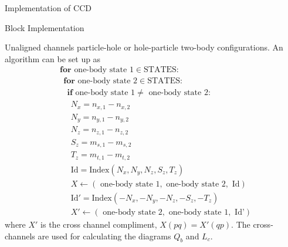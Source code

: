 \documentclass[twoside,english]{uiofysmaster}
\begin{document}
\begin{chapter}{Implementation of CCD}
\begin{section}{Block Implementation}
\begin{subsection}{Unaligned channels}
                        particle-hole or hole-particle two-body
                        configurations. An algorithm can be set up as
			\begin{align*}
				&\mathbf{for } \text{ one-body state 1} \in \text{STATES}:\\
				&\:\: \mathbf{for } \text{ one-body state 2} \in \text{STATES}:\\
				&\:\:\:\: \mathbf{if} \text{ one-body state 1} \neq \text{ one-body state 2}:\\
				&\:\:\:\:\:\: N_x = n_{x,1} - n_{x,2} \\
				&\:\:\:\:\:\: N_y = n_{y,1} - n_{y,2} \\
				&\:\:\:\:\:\: N_z = n_{z,1} - n_{z,2} \\
 				&\:\:\:\:\:\: S_z = m_{s,1} - m_{s,2} \\
				&\:\:\:\:\:\: T_z = m_{t,1} - m_{t,2} \\
				&\:\:\:\:\:\: \text{Id} = \text{Index}(N_x,N_y,N_z,S_z,T_z) \\
				&\:\:\:\:\:\: X \leftarrow (\text{ one-body state 1}, \text{ one-body state 2}, \text{ Id}) \\
				&\:\:\:\:\:\: \text{Id}' = \text{Index}(-N_x,-N_y,-N_z,-S_z,-T_z) \\
				&\:\:\:\:\:\: X' \leftarrow (\text{ one-body state 2}, \text{ one-body state 1}, \text{ Id'})
			\end{align*}
			where $X'$ is the cross channel compliment,
                        $X(pq) = X'(qp)$. The cross-channels are used
                        for calculating the diagrams $Q_b$ and $L_c$.


\end{subsection}
\end{section}
\end{chapter}
\end{document}
